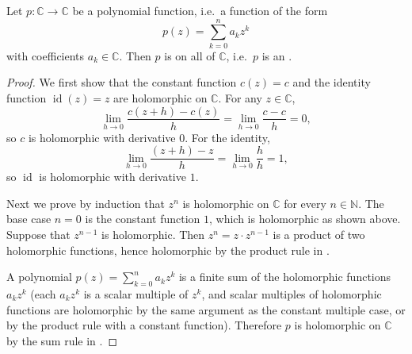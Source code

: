 \begin{proposition} \label{proposition:complex_polynomials_are_entire_functions}
    Let $p : \mathbb{C} \to \mathbb{C}$ be a polynomial function, i.e.\ a function of the form
    $$p(z) = \sum_{k=0}^n a_k z^k$$
    with coefficients $a_k \in \mathbb{C}$. Then $p$ is  on all of $\mathbb{C}$, i.e.\ $p$ is an .
\end{proposition}

\begin{proof}
    We first show that the constant function $c(z) = c$ and the identity function $\operatorname{id}(z) = z$ are holomorphic on $\mathbb{C}$. For any $z \in \mathbb{C}$,
    $$\lim_{h \to 0} \frac{c(z+h) - c(z)}{h} = \lim_{h \to 0} \frac{c - c}{h} = 0,$$
    so $c$ is holomorphic with derivative $0$. For the identity,
    $$\lim_{h \to 0} \frac{(z+h) - z}{h} = \lim_{h \to 0} \frac{h}{h} = 1,$$
    so $\operatorname{id}$ is holomorphic with derivative $1$.

    Next we prove by induction that $z^n$ is holomorphic on $\mathbb{C}$ for every $n \in \mathbb{N}$. The base case $n = 0$ is the constant function $1$, which is holomorphic as shown above. Suppose that $z^{n-1}$ is holomorphic. Then $z^n = z \cdot z^{n-1}$ is a product of two holomorphic functions, hence holomorphic by the product rule in .

    A polynomial $p(z) = \sum_{k=0}^n a_k z^k$ is a finite sum of the holomorphic functions $a_k z^k$ (each $a_k z^k$ is a scalar multiple of $z^k$, and scalar multiples of holomorphic functions are holomorphic by the same argument as the constant multiple case, or by the product rule with a constant function). Therefore $p$ is holomorphic on $\mathbb{C}$ by the sum rule in .
\end{proof}